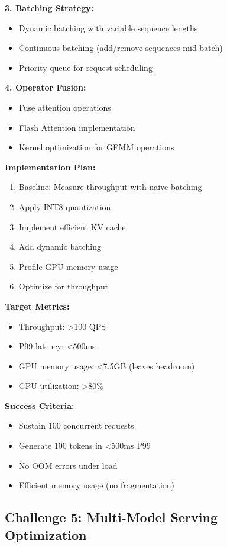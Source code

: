 \textbf{3. Batching Strategy:}
\begin{itemize}
    \item Dynamic batching with variable sequence lengths
    \item Continuous batching (add/remove sequences mid-batch)
    \item Priority queue for request scheduling
\end{itemize}

\textbf{4. Operator Fusion:}
\begin{itemize}
    \item Fuse attention operations
    \item Flash Attention implementation
    \item Kernel optimization for GEMM operations
\end{itemize}

\textbf{Implementation Plan:}
\begin{enumerate}
    \item Baseline: Measure throughput with naive batching
    \item Apply INT8 quantization
    \item Implement efficient KV cache
    \item Add dynamic batching
    \item Profile GPU memory usage
    \item Optimize for throughput
\end{enumerate}

\textbf{Target Metrics:}
\begin{itemize}
    \item Throughput: >100 QPS
    \item P99 latency: <500ms
    \item GPU memory usage: <7.5GB (leaves headroom)
    \item GPU utilization: >80\%
\end{itemize}

\textbf{Success Criteria:}
\begin{itemize}
    \item Sustain 100 concurrent requests
    \item Generate 100 tokens in <500ms P99
    \item No OOM errors under load
    \item Efficient memory usage (no fragmentation)
\end{itemize}

\subsection{Challenge 5: Multi-Model Serving Optimization}

